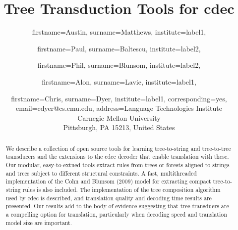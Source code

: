 \documentclass[nofonts]{pbml} %
\begin{document}
\title{Tree Transduction Tools for cdec}


\author{
  firstname=Austin,
  surname=Matthews,
  institute=label1,
}
\author{
  firstname=Paul,
  surname=Baltescu,
  institute=label2,
}
\author{
  firstname=Phil,
  surname=Blunsom,
  institute=label2,
}
\author{
  firstname=Alon,
  surname=Lavie,
  institute=label1,
}
\author{
  firstname=Chris,
  surname=Dyer,
  institute=label1,
  corresponding=yes,
  email={cdyer@cs.cmu.edu},
  address={Language Technologies Institute\\Carnegie Mellon University\\Pittsburgh, PA 15213, United States}
}

\PBMLmaketitle

\begin{abstract}
We describe a collection of open source tools for learning
tree-to-string and tree-to-tree transducers and the extensions to the
cdec decoder that enable translation with these. Our modular,
easy-to-extned tools extract rules from trees or forests aligned to
strings and trees subject to different structural constraints. A fast,
multithreaded implementation of the Cohn and Blunsom (2009) model for
extracting compact tree-to-string rules is also included. The
implementation of the tree composition algorithm used by cdec is
described, and translation quality and decoding time results are
presented. Our results add to the body of evidence suggesting that
tree transduers are a compelling option for translation, particularly
when decoding speed and translation model size are important.
\end{abstract}


\end{document}
